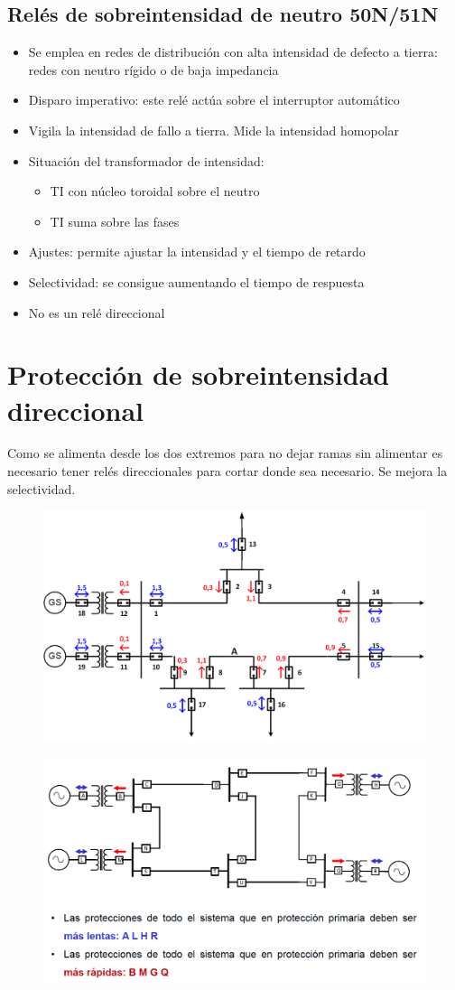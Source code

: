 \subsection{Relés de sobreintensidad de neutro 50N/51N}
\begin{itemize}
	\item Se emplea en redes de distribución con alta intensidad de defecto a tierra: redes con neutro rígido o de baja impedancia
	\item Disparo imperativo: este relé actúa sobre el interruptor automático
	\item Vigila la intensidad de fallo a tierra. Mide la intensidad homopolar
	\item Situación del transformador de intensidad:
	\begin{itemize}
		\item TI con núcleo toroidal sobre el neutro
		\item TI suma sobre las fases
	\end{itemize}
	\item Ajustes: permite ajustar la intensidad y el tiempo de retardo
	\item Selectividad: se consigue aumentando el tiempo de respuesta
	\item No es un relé direccional
\end{itemize}
\section{Protección de sobreintensidad direccional}
Como se alimenta desde los dos extremos para no dejar ramas sin alimentar es necesario tener relés direccionales para cortar donde sea necesario. Se mejora la selectividad.
\begin{figure}[H]
	\centering
	\includegraphics[width=0.7\linewidth]{Images/63}
	\label{fig:63}
\end{figure}

\begin{figure}[H]
	\centering
	\includegraphics[width=0.7\linewidth]{Images/64}
	\label{fig:64}
\end{figure}


